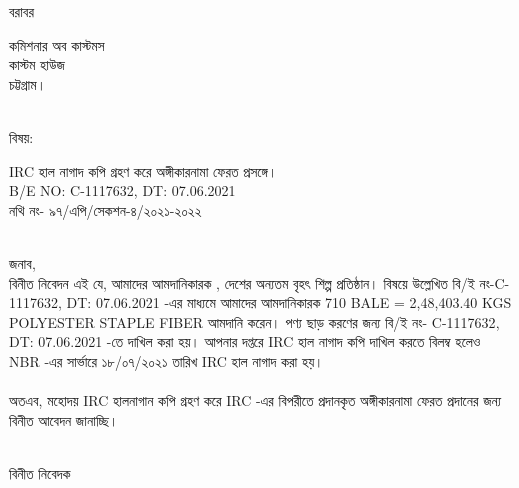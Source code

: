 \documentclass[12pt]{article}
\newcommand{\beno}{C-1117632}
\newcommand{\bedt}{07.06.2021}
\newcommand{\pkg}{710 BALE = 2,48,403.40 KGS}
\newcommand{\good}{POLYESTER STAPLE FIBER}
\newcommand{\impn}{\jsml}
\begin{document}
\noindent
বরাবর
\\
\begin{minipage}[t]{0.06\linewidth}
\hspace{1em}
\end{minipage}
\begin{minipage}[t]{0.94\linewidth}
কমিশনার অব কাস্টমস
\\
কাস্টম হাউজ
\\
চট্টগ্রাম।
\\
\\
\end{minipage}
\begin{minipage}[t]{0.06\linewidth}
বিষয়:
\end{minipage}
\begin{minipage}[t]{0.94\linewidth}
IRC হাল নাগাদ কপি গ্রহণ করে অঙ্গীকারনামা ফেরত প্রসঙ্গে।
\\
B/E NO: {\beno}, DT: {\bedt}
\\
নথি নং- ৯৭/এপি/সেকশন-৪/২০২১-২০২২
\\
\\
\end{minipage}
জনাব,
\\
\hspace*{2.7em}
বিনীত নিবেদন এই যে, আমাদের আমদানিকারক {\impn},
দেশের অন্যতম বৃহৎ শিল্প প্রতিষ্ঠান।
বিষয়ে উল্লেখিত বি/ই নং-{\beno}, DT: {\bedt} -এর মাধ্যমে
আমাদের আমদানিকারক {\pkg} {\good}
আমদানি করেন। পণ্য ছাড় করণের জন্য
বি/ই নং- {\beno}, DT: {\bedt} -তে দাখিল করা হয়।
আপনার দপ্তরে IRC হাল নাগাদ কপি দাখিল
করতে বিলম্ব হলেও NBR -এর
সার্ভারে ১৮/০৭/২০২১ তারিখ
IRC হাল নাগাদ করা হয়।
\\
\\
অতএব, মহোদয় IRC হালনাগান কপি গ্রহণ করে
IRC -এর বিপরীতে প্রদানকৃত অঙ্গীকারনামা ফেরত
প্রদানের জন্য বিনীত আবেদন জানাচ্ছি।
\\
\\
\begin{minipage}[t]{0.55\linewidth}
\hspace{1em}
\end{minipage}
\begin{minipage}[t]{0.45\linewidth}
বিনীত নিবেদক
\\
\\
\\
\\
\\
{\cnfn}
\end{minipage}
\thispagestyle{laststyle}
\end{document}
